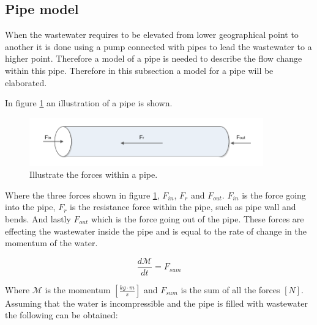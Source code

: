 
\subsection{Pipe model}\label{se:pipe_model}
When the wastewater requires to be elevated from lower geographical point to another it is done using a pump connected with pipes to lead the wastewater to a higher point. Therefore a model of a pipe is needed to describe the flow change within this pipe. Therefore in this subsection a model for a pipe will be elaborated. 

In figure \ref{fig:pipe_3d} an illustration of a pipe is shown.
\begin{figure}[H]
\centering
\includegraphics[width=0.9\textwidth]{report/modeling/pictures/pipe_3d.pdf}
\caption{Illustrate the forces within a pipe.}
\label{fig:pipe_3d}
\end{figure}

Where the three forces shown in figure \ref{fig:pipe_3d}, $F_{in}$, $F_r$ and $F_{out}$. $F_{in}$ is the force going into the pipe, $F_r$ is the resistance force within the pipe, such as pipe wall and bends. And lastly $F_{out}$ which is the force going out of the pipe. These forces are effecting the wastewater inside the pipe and is equal to the rate of change in the momentum of the water. 

\begin{equation}
	\frac{d\mathcal{M}}{dt}=F_{sum}
\end{equation}

Where $\mathcal{M}$ is the momentum $\left[\frac{kg\cdot m}{s}\right]$ and $F_{sum}$ is the sum of all the forces $[N]$. Assuming that the water is incompressible and the pipe is filled with wastewater the following can be obtained: 

